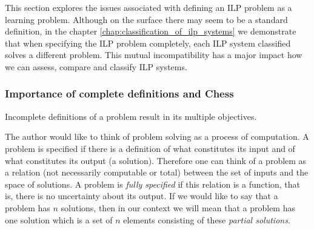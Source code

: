 This section explores the issues associated with defining an ILP problem as a learning problem. Although on the surface there may seem to be a standard definition, in the chapter \ref{chap:classification_of_ilp_systems} we demonstrate that when specifying the ILP problem completely, each ILP system classified solves a different problem. This mutual incompatibility has a major impact how we can assess, compare and classify ILP systems.

\subsubsection{Importance of complete definitions and Chess}
Incomplete definitions of a problem result in its multiple objectives.

The author would like to think of problem solving as a process of computation. A problem is specified if there is a definition of what constitutes its input and of what constitutes its output (a solution). Therefore one can think of a problem as a relation (not necessarily computable or total) between the set of inputs and the space of solutions. A problem is \emph{fully specified} if this relation is a function, that is, there is no uncertainty about its output. If we would like to say that a problem has $n$ solutions, then in our context we will mean that a problem has one solution which is a set of $n$ elements consisting of these \emph{partial solutions}.

